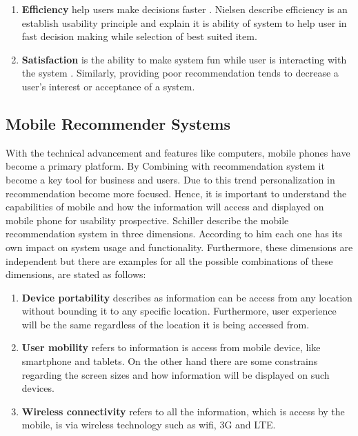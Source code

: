 \begin{enumerate}
	\item \textbf{Efficiency} help users make decisions faster \cite{tintarev2007survey}. Nielsen describe efficiency is an establish usability principle and explain it is ability of system to help user in fast decision making while selection of best suited item\cite{nielsen1990heuristic}.
	
	\item \textbf{Satisfaction} is the ability to make system fun while user is interacting with the system \cite{tintarev2007survey}. Similarly, providing poor recommendation tends to decrease a user’s interest \cite{ tanaka2000multi} or acceptance of a system\cite{herlocker2000explaining}.
	
\end{enumerate}

\subsection{Mobile Recommender Systems}

With the technical advancement and features like computers, mobile phones have become a primary platform. By Combining with recommendation system it become a key tool for business and users. Due to this trend personalization in recommendation become more focused. Hence, it is important to understand the capabilities of mobile and how the information will access and displayed on mobile phone for usability prospective\cite{nielsen1990heuristic}. Schiller \cite{schiller2003mobile} describe the mobile recommendation system in three dimensions. According to him each one has its own impact on system usage and functionality. Furthermore, these dimensions are independent but there are examples for all the possible combinations of these dimensions, are stated as follows:

\begin{enumerate}

	\item \textbf{Device portability} describes as information can be access from any location without bounding it to any specific location. Furthermore, user experience will be the same regardless of the location it is being accessed from. 
	
	\item \textbf{User mobility} refers to information is access from mobile device, like smartphone and tablets. On the other hand there are some constrains regarding the screen sizes and how information will be displayed on such devices.
	
	\item \textbf{Wireless connectivity} refers to all the information, which is access by the mobile, is via wireless technology such as wifi, 3G and LTE.
	
\end{enumerate}

